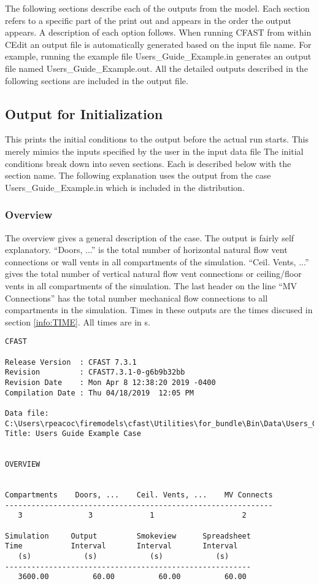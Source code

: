 The following sections describe each of the outputs from the model.  Each section refers to a specific part of the print out and appears in the order the output appears. A description of each option follows. When running CFAST from within CEdit an output file is automatically generated based on the input file name. For example, running the example file  {\ct Users\_Guide\_Example.in} generates an output file named  {\ct Users\_Guide\_Example.out}. All the detailed outputs described in the following sections are included in the output file.

\subsection{Output for Initialization}

This prints the initial conditions to the output before the actual run starts.  This merely mimics the inputs specified by the user in the input data file  The initial conditions break down into seven sections.  Each is described below with the section name. The following explanation uses the output from the case {\ct Users\_Guide\_Example.in} which is included in the distribution.

\subsubsection{Overview}

The overview gives a general description of the case.  The output is fairly self explanatory. ``Doors, ...'' is the total number of horizontal natural flow vent connections or wall vents in all compartments of the simulation.  ``Ceil. Vents, ...'' gives the total number of vertical natural flow vent connections or ceiling/floor vents in all compartments of the simulation.  The last header on the line ``MV Connections'' has the total number mechanical flow connections to all compartments in the simulation. Times in these outputs are the times discused in section \ref{info:TIME}. All times are in s.
\begin{lstlisting}[basicstyle=\tiny]
CFAST

Release Version  : CFAST 7.3.1
Revision         : CFAST7.3.1-0-g6b9b32bb
Revision Date    : Mon Apr 8 12:38:20 2019 -0400
Compilation Date : Thu 04/18/2019  12:05 PM

Data file: C:\Users\rpeacoc\firemodels\cfast\Utilities\for_bundle\Bin\Data\Users_Guide_Example.in
Title: Users Guide Example Case


OVERVIEW


Compartments    Doors, ...    Ceil. Vents, ...    MV Connects
-------------------------------------------------------------
   3               3             1                    2

Simulation     Output         Smokeview      Spreadsheet
Time           Interval       Interval       Interval
   (s)            (s)            (s)            (s)
--------------------------------------------------------
   3600.00          60.00          60.00          60.00
\end{lstlisting}


